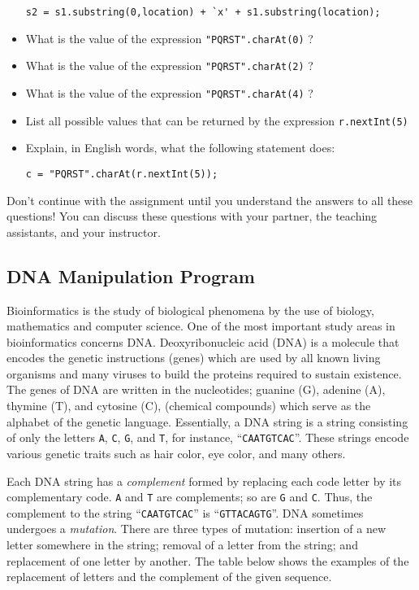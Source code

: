 \begin{itemize}
\begin{center}
\verb$s2 = s1.substring(0,location) + `x' + s1.substring(location);$
\end{center}
\item
What is the value of the expression \verb$"PQRST".charAt(0)$ ?
\item
What is the value of the expression \verb$"PQRST".charAt(2)$ ?
\item
What is the value of the expression \verb$"PQRST".charAt(4)$ ?
\item
List all possible values that can be returned by the expression
\verb$r.nextInt(5)$
\item
Explain, in English words, what the following statement does:
\begin{center}
\verb$c = "PQRST".charAt(r.nextInt(5));$
\end{center}
\end{itemize}

\noindent Don't continue with the assignment until you understand the answers to all these questions!  You can discuss
these questions with your partner, the teaching assistants, and your instructor.

\vspace{-0.05in}
\subsection*{DNA Manipulation Program}
\vspace{-0.05in}
Bioinformatics is the study of biological phenomena by the use of biology, mathematics and computer science. One of the most important study areas in bioinformatics concerns DNA. Deoxyribonucleic acid (DNA) is a molecule that encodes the genetic instructions (genes) which are used by all known living organisms and many viruses to build the proteins required to sustain existence. The genes of DNA are written in the nucleotides; guanine (G), adenine (A), thymine (T), and cytosine (C), (chemical compounds) which serve as the alphabet of the genetic language.
Essentially, a DNA string is a string consisting of only the letters {\tt A}, {\tt C}, {\tt G}, and {\tt T}, for instance, ``{\tt CAATGTCAC}''. These strings encode
various genetic traits such as hair color, eye color, and many others.

Each DNA string has a {\em complement} formed by replacing each code letter by its
complementary code. {\tt A} and {\tt T} are complements; so are {\tt G} and
{\tt C}. Thus, the complement to the string ``{\tt CAATGTCAC}'' is
``{\tt GTTACAGTG}''.
DNA sometimes undergoes a {\em mutation}. There are three types of mutation:
insertion of a new letter somewhere in the string; removal of a letter from the
string; and replacement of one letter by another. The table below shows the examples of the replacement of letters and the complement of the given sequence.

